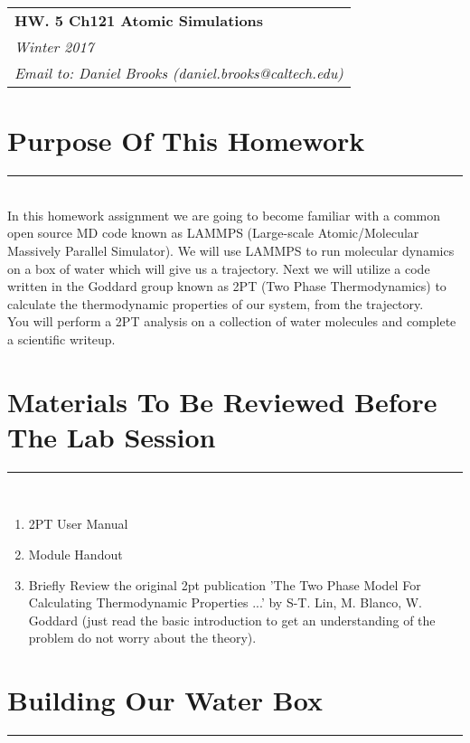 \documentclass{article}
\begin{document}
\null\hfill\begin{tabular}[t]{l@{}}
  \textbf{HW. 5 Ch121 Atomic Simulations}\\
  \textit{Winter 2017}\\
  \textit{Email to: Daniel Brooks (daniel.brooks@caltech.edu)}
\end{tabular}
\vspace{10mm}

\noindent

\section*{Purpose Of This Homework}
\noindent\rule[0.5ex]{\linewidth}{1pt}\\

In this homework assignment we are going to become familiar with a common open source MD code known as LAMMPS (Large-scale Atomic/Molecular Massively Parallel Simulator). 
We will use LAMMPS to run molecular dynamics on a box of water which will give us a trajectory. 
Next we will utilize a code written in the Goddard group known as 2PT (Two Phase Thermodynamics) to calculate the thermodynamic properties of our system, from the trajectory. \\

You will perform a 2PT analysis on a collection of water molecules and complete a scientific writeup. \\

\section*{Materials To Be Reviewed Before The Lab Session}
\noindent\rule[0.5ex]{\linewidth}{1pt}\\

\begin{enumerate}
    \item 2PT User Manual
    \item Module Handout
    \item Briefly Review the original 2pt publication 'The Two Phase Model For Calculating Thermodynamic Properties ...' by S-T. Lin, M. Blanco, W. Goddard (just read the basic introduction to get an understanding of the problem do not worry about the theory).
\end{enumerate}

\section{Building Our Water Box}
\noindent\rule[0.5ex]{\linewidth}{1pt}\\
\end{document}

